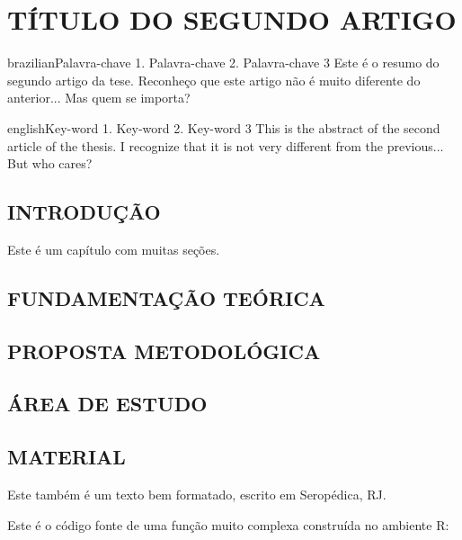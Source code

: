 \artigotrue
\chapter{TÍTULO DO SEGUNDO ARTIGO}
\label{chap:chapter01}

\begin{chapterabstract}{brazilian}{Palavra-chave 1. Palavra-chave 2. Palavra-chave 3}
Este é o resumo do segundo artigo da tese. Reconheço que este artigo não é muito
diferente do anterior... Mas quem se importa?
\end{chapterabstract}

\begin{chapterabstract}{english}{Key-word 1. Key-word 2. Key-word 3}
This is the abstract of the second article of the thesis. I recognize that it is
not very different from the previous... But who cares?
\end{chapterabstract}

\formatchapter

\section{INTRODUÇÃO}

Este é um capítulo com muitas seções.

\section{FUNDAMENTAÇÃO TEÓRICA}

\blindtext[1]

\section{PROPOSTA METODOLÓGICA}

\blindtext[1]

\section{ÁREA DE ESTUDO}

\section{MATERIAL}

Este também é um texto bem formatado, escrito em Seropédica, RJ. \blindtext[1]

Este é o código fonte de uma função muito complexa construída no ambiente R:

